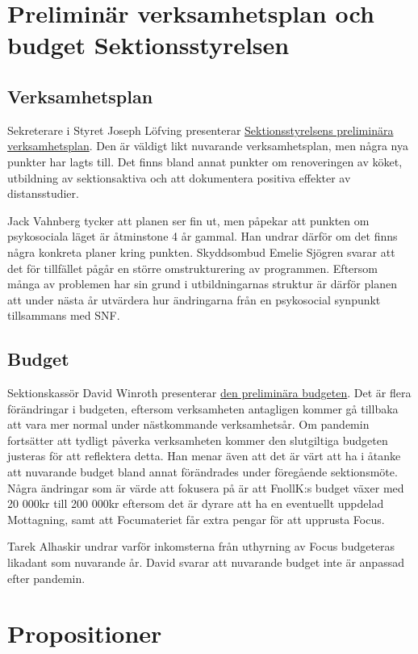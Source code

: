 \documentclass[hidelinks]{sektionsmote}
\begin{document}
\section{Preliminär verksamhetsplan och budget Sektionsstyrelsen}

\subsection{Verksamhetsplan}
Sekreterare i Styret Joseph Löfving presenterar \hyperlink{bilagor/pvp.pdf.1}{Sektionsstyrelsens preliminära verksamhetsplan}.
Den är väldigt likt nuvarande verksamhetsplan, men några nya punkter har lagts till.
Det finns bland annat punkter om renoveringen av köket, utbildning av sektionsaktiva och att dokumentera positiva effekter av distansstudier.

Jack Vahnberg tycker att planen ser fin ut, men påpekar att punkten om psykosociala läget är åtminstone 4 år gammal.
Han undrar därför om det finns några konkreta planer kring punkten.
Skyddsombud Emelie Sjögren svarar att det för tillfället pågår en större omstrukturering av programmen.
Eftersom många av problemen har sin grund i utbildningarnas struktur är därför planen att under nästa år utvärdera hur ändringarna från en psykosocial synpunkt tillsammans med SNF.

\subsection{Budget}
Sektionskassör David Winroth presenterar \hyperlink{bilagor/budget.pdf.1}{den preliminära budgeten}.
Det är flera förändringar i budgeten, eftersom verksamheten antagligen kommer gå tillbaka att vara mer normal under nästkommande verksamhetsår.
Om pandemin fortsätter att tydligt påverka verksamheten kommer den slutgiltiga budgeten justeras för att reflektera detta.
Han menar även att det är värt att ha i åtanke att nuvarande budget bland annat förändrades under föregående sektionsmöte.
Några ändringar som är värde att fokusera på är att FnollK:s budget växer med 20 000kr till 200 000kr eftersom det är dyrare att ha en eventuellt uppdelad Mottagning, samt att Focumateriet får extra pengar för att upprusta Focus.

Tarek Alhaskir undrar varför inkomsterna från uthyrning av Focus budgeteras likadant som nuvarande år.
David svarar att nuvarande budget inte är anpassad efter pandemin.


\section{Propositioner}
\end{document}
